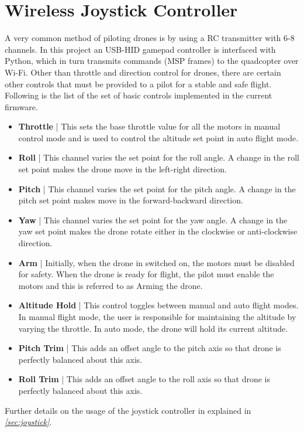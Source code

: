 \documentclass[a4paper,12pt,oneside]{book}
\begin{document}
\bigskip

\section{Wireless Joystick Controller}
A very common method of piloting drones is by using a RC transmitter with 6-8 channels. In this project an USB-HID gamepad controller is interfaced with Python, which in turn transmits commands (MSP frames) to the quadcopter over Wi-Fi. Other than throttle and direction control for drones, there are certain other controls that must be provided to a pilot for a stable and safe flight. Following is the list of the set of basic controls implemented in the current firmware.\\

\begin{itemize}
\item \textbf{Throttle} | This sets the base throttle value for all the motors in manual control mode and is used to control the altitude set point in auto flight mode.

\item \textbf{Roll} | This channel varies the set point for the roll angle. A change in the roll set point makes the drone move in the left-right direction.

\item \textbf{Pitch} | This channel varies the set point for the pitch angle. A change in the pitch set point makes move in the forward-backward direction.

\item \textbf{Yaw} | This channel varies the set point for the yaw angle. A change in the yaw set point makes the drone rotate either in the clockwise or anti-clockwise direction.

\item \textbf{Arm} | Initially, when the drone in switched on, the motors must be disabled for safety. When the drone is ready for flight, the pilot must enable the motors and this is referred to as Arming the drone.

\item \textbf{Altitude Hold} | This control toggles between manual and auto flight modes. In manual flight mode, the user is responsible for maintaining the altitude by varying the throttle. In auto mode, the drone will hold its current altitude.

\item \textbf{Pitch Trim} | This adds an offset angle to the pitch axis so that drone is perfectly balanced about this axis.

\item \textbf{Roll Trim} | This adds an offset angle to the roll axis so that drone is perfectly balanced about this axis.\\
\end{itemize}
Further details on the usage of the joystick controller in explained in \textit{\autoref{sec:joystick}}.
\end{document}
